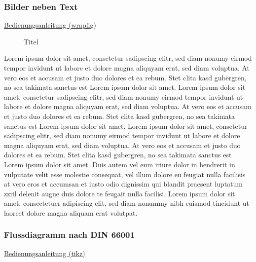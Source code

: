 \documentclass[a4paper, 11pt]{article}
\begin{document}
\newpage

\subsubsection{Bilder neben Text}

\href{https://ctan.ebinger.cc/tex-archive/macros/latex/contrib/wrapfig/wrapfig-doc.pdf}{Bedienungsanleitung (wrapfig)}

\par\medskip
\begin{wrapfigure}[11]{r}[0pt]{5cm}
    \centering
    \caption[Titel in Abbildungsverzeichnis (wrapfig)]{Titel\footnotemark}
    \label{fig:ExampleFloatImage}
\end{wrapfigure}
Lorem ipsum dolor sit amet, consetetur sadipscing elitr, sed diam nonumy eirmod tempor invidunt ut labore et dolore magna aliquyam erat, sed diam voluptua. At vero eos et accusam et justo duo dolores et ea rebum. Stet clita kasd gubergren, no sea takimata sanctus est Lorem ipsum dolor sit amet. Lorem ipsum dolor sit amet, consetetur sadipscing elitr, sed diam nonumy eirmod tempor invidunt ut labore et dolore magna aliquyam erat, sed diam voluptua. At vero eos et accusam et justo duo dolores et ea rebum. Stet clita kasd gubergren, no sea takimata sanctus est Lorem ipsum dolor sit amet. Lorem ipsum dolor sit amet, consetetur sadipscing elitr, sed diam nonumy eirmod tempor invidunt ut labore et dolore magna aliquyam erat, sed diam voluptua. At vero eos et accusam et justo duo dolores et ea rebum. Stet clita kasd gubergren, no sea takimata sanctus est Lorem ipsum dolor sit amet.
Duis autem vel eum iriure dolor in hendrerit in vulputate velit esse molestie consequat, vel illum dolore eu feugiat nulla facilisis at vero eros et accumsan et iusto odio dignissim qui blandit praesent luptatum zzril delenit augue duis dolore te feugait nulla facilisi. Lorem ipsum dolor sit amet, consectetuer adipiscing elit, sed diam nonummy nibh euismod tincidunt ut laoreet dolore magna aliquam erat volutpat.
\newpage

\subsubsection{Flussdiagramm nach DIN 66001}

\href{https://tikz.dev/}{Bedienungsanleitung (tikz)}
\end{document}
